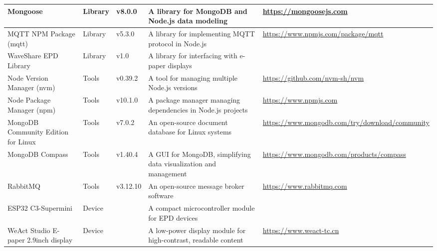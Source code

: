 \documentclass[../Main.tex]{subfiles}
\begin{document}
\begin{table}[H]
\begin{tabular}{| m{3cm} | m{1cm} | m{1.4cm} | m{4cm} | m{4cm} |}
        Mongoose                                & Library       & v8.0.0            & A library for MongoDB and Node.js data modeling                   & \url{https://mongoosejs.com}                                      \\ \hline
        MQTT NPM Package (mqtt)                 & Library       & v5.3.0            & A library for implementing MQTT protocol in Node.js               & \url{https://www.npmjs.com/package/mqtt}                          \\ \hline
        WaveShare EPD Library                   & Library       & v1.0              & A library for interfacing with e-paper displays                   &                                                                   \\ \hline
        Node Version Manager (nvm)              & Tools         & v0.39.2           & A tool for managing multiple Node.js versions                     & \url{https://github.com/nvm-sh/nvm}                               \\ \hline
        Node Package Manager (npm)              & Tools         & v10.1.0           & A package manager managing dependencies in Node.js projects       & \url{https://www.npmjs.com}                                       \\ \hline
        MongoDB Community Edition for Linux     & Tools         & v7.0.2            & An open-source document database for Linux systems                & \url{https://www.mongodb.com/try/download/community}              \\ \hline
        MongoDB Compass                         & Tools         & v1.40.4           & A GUI for MongoDB, simplifying data visualization and management  & \url{https://www.mongodb.com/products/compass}                    \\ \hline
        RabbitMQ                                & Tools         & v3.12.10          & An open-source message broker software                            & \url{https://www.rabbitmq.com}                                    \\ \hline
        ESP32 C3-Supermini                      & Device        &                   & A compact microcontroller module for EPD devices                  &                                                                   \\ \hline
        WeAct Studio E-paper 2.9inch display    & Device        &                   & A low-power display module for high-contrast, readable content    & \url{https://www.weact-tc.cn}                                     \\ \hline

\end{tabular}
\end{table}
\end{document}
